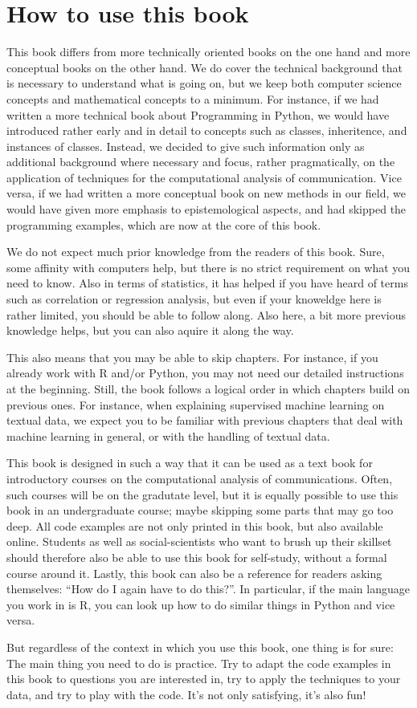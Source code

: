 \section{How to use this book}

This book differs from more technically oriented books on the one hand
and more conceptual books on the other hand. We do cover the technical
background that is necessary to understand what is going on, but we
keep both computer science concepts and mathematical concepts to a
minimum. For instance, if we had written a more technical book about
Programming in Python, we would have introduced rather early and in
detail to concepts such as classes, inheritence, and instances of
classes. Instead, we decided to give such information only as
additional background where necessary and focus, rather pragmatically,
on the application of techniques for the computational analysis of
communication. Vice versa, if we had written a more conceptual book on
new methods in our field, we would have given more emphasis to
epistemological aspects, and had skipped the programming examples,
which are now at the core of this book.

We do not expect much prior knowledge from the readers of this
book. Sure, some affinity with computers help, but there is no strict
requirement on what you need to know. Also in terms of statistics, it
has helped if you have heard of terms such as correlation or
regression analysis, but even if your knoweldge here is rather
limited, you should be able to follow along. Also here, a bit more
previous knowledge helps, but you can also aquire it along the way.

This also means that you may be able to skip chapters. For instance,
if you already work with R and/or Python, you may not need our
detailed instructions at the beginning. Still, the book follows a
logical order in which chapters build on previous ones. For instance,
when explaining supervised machine learning on textual data, we expect
you to be familiar with previous chapters that deal with machine
learning in general, or with the handling of textual data.

This book is designed in such a way that it can be used as a text book
for introductory courses on the computational analysis of
communications. Often, such courses will be on the gradutate level,
but it is equally possible to use this book in an undergraduate
course; maybe skipping some parts that may go too deep. All code
examples are not only printed in this book, but also available
online. Students as well as social-scientists who want to brush up
their skillset should therefore also be able to use this book for
self-study, without a formal course around it. Lastly, this book can
also be a reference for readers asking themselves: ``How do I again
have to do this?''. In particular, if the main language you work in is
R, you can look up how to do similar things in Python and vice versa.

But regardless of the context in which you use this book, one thing is
for sure: The main thing you need to do is practice. Try to adapt the
code examples in this book to questions you are interested in, try to
apply the techniques to your data, and try to play with the code. It's
not only satisfying, it's also fun!
